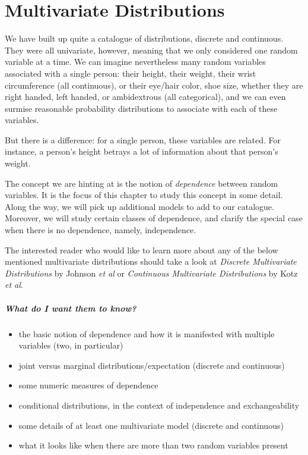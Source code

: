 \documentclass[captions=tableheading]{scrbook}
\begin{document}
\chapter{Multivariate Distributions}
\label{sec-7}

\label{cha:Multivariable-Distributions}


\noindent We have built up quite a catalogue of distributions, discrete and continuous. They were all univariate, however, meaning that we only considered one random variable at a time. We can imagine nevertheless many random variables associated with a single person: their height, their weight, their wrist circumference (all continuous), or their eye/hair color, shoe size, whether they are right handed, left handed, or ambidextrous (all categorical), and we can even surmise reasonable probability distributions to associate with each of these variables.

But there is a difference: for a single person, these variables are related. For instance, a person's height betrays a lot of information about that person's weight.

The concept we are hinting at is the notion of \emph{dependence} between random variables. It is the focus of this chapter to study this concept in some detail. Along the way, we will pick up additional models to add to our catalogue. Moreover, we will study certain classes of dependence, and clarify the special case when there is no dependence, namely, independence.

The interested reader who would like to learn more about any of the below mentioned multivariate distributions should take a look at \emph{Discrete Multivariate Distributions} by Johnson \emph{et al}\cite{Johnson1997} or \emph{Continuous Multivariate Distributions} \cite{Kotz2000} by Kotz \emph{et al}.



\paragraph*{What do I want them to know?}

\begin{itemize}
\item the basic notion of dependence and how it is manifested with multiple variables (two, in particular)
\item joint versus marginal distributions/expectation (discrete and continuous)
\item some numeric measures of dependence
\item conditional distributions, in the context of independence and exchangeability
\item some details of at least one multivariate model (discrete and continuous)
\item what it looks like when there are more than two random variables present
\end{itemize}
\end{document}
